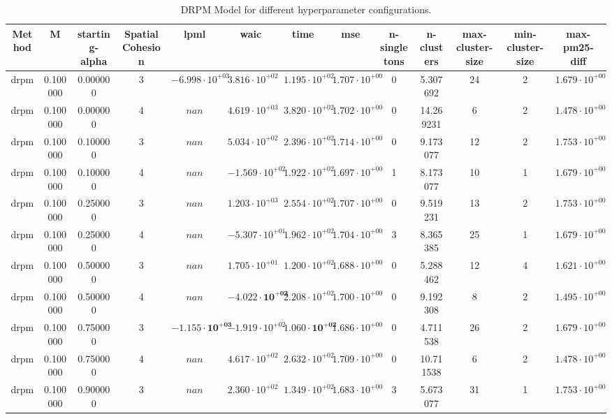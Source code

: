 \begin{table}
\caption{DRPM Model for different hyperparameter configurations.}
\centering
\begin{tabular}{ccccccccccccc}
\toprule
Method & M & starting-alpha & SpatialCohesion & lpml & waic & time & mse & n-singletons & n-clusters & max-cluster-size & min-cluster-size & max-pm25-diff \\
\midrule
drpm & 0.100000 & 0.000000 & 3 & $-6.998 \cdot 10^{+03}$ & $3.816 \cdot 10^{+02}$ & $1.195 \cdot 10^{+02}$ & $1.707 \cdot 10^{+00}$ & 0 & 5.307692 & 24 & 2 & $1.679 \cdot 10^{+00}$ \\
drpm & 0.100000 & 0.000000 & 4 & $nan$ & $4.619 \cdot 10^{+03}$ & $3.820 \cdot 10^{+02}$ & $1.702 \cdot 10^{+00}$ & 0 & 14.269231 & 6 & 2 & $1.478 \cdot 10^{+00}$ \\
drpm & 0.100000 & 0.100000 & 3 & $nan$ & $5.034 \cdot 10^{+02}$ & $2.396 \cdot 10^{+02}$ & $1.714 \cdot 10^{+00}$ & 0 & 9.173077 & 12 & 2 & $1.753 \cdot 10^{+00}$ \\
drpm & 0.100000 & 0.100000 & 4 & $nan$ & $-1.569 \cdot 10^{+02}$ & $1.922 \cdot 10^{+02}$ & $1.697 \cdot 10^{+00}$ & 1 & 8.173077 & 10 & 1 & $1.679 \cdot 10^{+00}$ \\
drpm & 0.100000 & 0.250000 & 3 & $nan$ & $1.203 \cdot 10^{+03}$ & $2.554 \cdot 10^{+02}$ & $1.707 \cdot 10^{+00}$ & 0 & 9.519231 & 13 & 2 & $1.753 \cdot 10^{+00}$ \\
drpm & 0.100000 & 0.250000 & 4 & $nan$ & $-5.307 \cdot 10^{+01}$ & $1.962 \cdot 10^{+02}$ & $1.704 \cdot 10^{+00}$ & 3 & 8.365385 & 25 & 1 & $1.679 \cdot 10^{+00}$ \\
drpm & 0.100000 & 0.500000 & 3 & $nan$ & $1.705 \cdot 10^{+01}$ & $1.200 \cdot 10^{+02}$ & $1.688 \cdot 10^{+00}$ & 0 & 5.288462 & 12 & 4 & $1.621 \cdot 10^{+00}$ \\
drpm & 0.100000 & 0.500000 & 4 & $nan$ & $\mathbf{-4.022 \cdot 10^{+02}}$ & $2.208 \cdot 10^{+02}$ & $1.700 \cdot 10^{+00}$ & 0 & 9.192308 & 8 & 2 & $1.495 \cdot 10^{+00}$ \\
drpm & 0.100000 & 0.750000 & 3 & $\mathbf{-1.155 \cdot 10^{+03}}$ & $-1.919 \cdot 10^{+02}$ & $\mathbf{1.060 \cdot 10^{+02}}$ & $1.686 \cdot 10^{+00}$ & 0 & 4.711538 & 26 & 2 & $1.679 \cdot 10^{+00}$ \\
drpm & 0.100000 & 0.750000 & 4 & $nan$ & $4.617 \cdot 10^{+02}$ & $2.632 \cdot 10^{+02}$ & $1.709 \cdot 10^{+00}$ & 0 & 10.711538 & 6 & 2 & $1.478 \cdot 10^{+00}$ \\
drpm & 0.100000 & 0.900000 & 3 & $nan$ & $2.360 \cdot 10^{+02}$ & $1.349 \cdot 10^{+02}$ & $1.683 \cdot 10^{+00}$ & 3 & 5.673077 & 31 & 1 & $1.753 \cdot 10^{+00}$ \\

\end{tabular}
\end{table}
